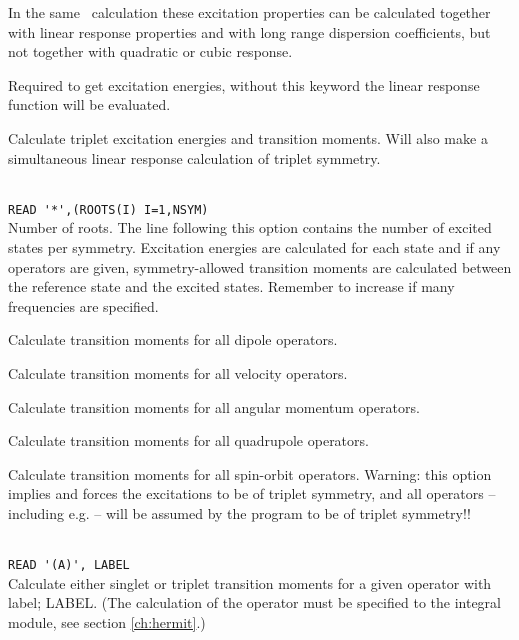 In the same \resp\ calculation these excitation properties can be calculated
together with linear response properties
and with long range dispersion coefficients, but not 
together with quadratic or cubic response.

\begin{description}

\item{} Required to get excitation energies, without
this keyword the linear response function will be evaluated.

\item{} Calculate triplet excitation energies and transition moments.
Will also make a simultaneous linear response calculation of triplet symmetry.

\item{}\\
\verb|READ '*',(ROOTS(I) I=1,NSYM)|\\
Number of roots.  The line following this option contains the number
of excited states per symmetry. Excitation
energies are calculated for each state and if
any operators are given, 
symmetry-allowed transition moments are
calculated between the 
reference state and the excited states.
Remember to increase  if many frequencies are specified.

\item{}
Calculate transition moments for all dipole operators.

\item{}
Calculate transition moments for all velocity operators.

\item{}
Calculate transition moments for all angular momentum operators.

\item{}
Calculate transition moments for all quadrupole operators.

\item{}
Calculate transition moments for all spin-orbit operators.
Warning: this option implies  and
forces the excitations to be of triplet symmetry,
and all operators -- including
e.g.  -- will be assumed by the program to be of triplet symmetry!!

\item{}\\
\verb|READ '(A)', LABEL|\\
Calculate either singlet or triplet transition moments for a given operator with label; LABEL.
(The calculation of the operator must be specified to the integral
module, see section \ref{ch:hermit}.)


\end{description}
